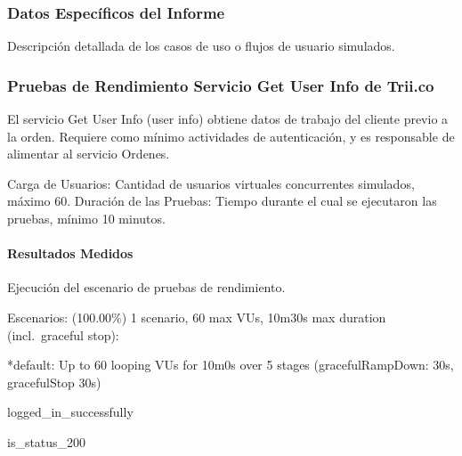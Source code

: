 \documentclass[
  paper=a4,
  ,captions=tableheading
]{scrartcl}
\renewenvironment{quote}{\begin{customblockquote}\list{}{\rightmargin=0em\leftmargin=0em}%
\item\relax\color{blockquote-text}\ignorespaces}{\unskip\unskip\endlist\end{customblockquote}}
\begin{document}
\subsubsection{Datos Específicos del
Informe}\label{sec:datos-especuxedficos-del-informe}

Descripción detallada de los casos de uso o flujos de usuario simulados.

\subsubsection{Pruebas de Rendimiento Servicio Get User Info de
Trii.co}\label{sec:pruebas-de-rendimiento-servicio-get-user-info-de-trii.co}

El servicio Get User Info (user info) obtiene datos de trabajo del
cliente previo a la orden. Requiere como mínimo actividades de
autenticación, y es responsable de alimentar al servicio Ordenes.

Carga de Usuarios: Cantidad de usuarios virtuales concurrentes
simulados, máximo 60. Duración de las Pruebas: Tiempo durante el cual se
ejecutaron las pruebas, mínimo 10 minutos.

\paragraph{Resultados Medidos}\label{sec:resultados-medidos}

Ejecución del escenario de pruebas de rendimiento.

\begin{quote}
Escenarios: (100.00\%) 1 scenario, 60 max VUs, 10m30s max duration
(incl.~graceful stop):

*default: Up to 60 looping VUs for 10m0s over 5 stages
(gracefulRampDown: 30s, gracefulStop 30s)

logged\_in\_successfully

is\_status\_200
\end{quote}
\end{document}
